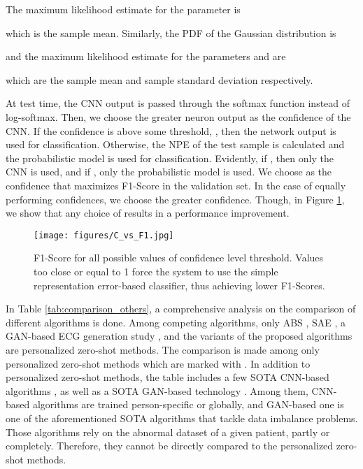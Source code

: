 \documentclass[journal,transmag]{IEEEtran}
\begin{document}
The maximum likelihood estimate for the parameter  is 


which is the sample mean. Similarly, the PDF of the Gaussian distribution is


and the maximum likelihood estimate for the parameters  and  are


which are the sample mean and sample standard deviation respectively.

At test time, the CNN output is passed through the softmax function instead of log-softmax. Then, we choose the greater neuron output as the confidence of the CNN. If the confidence is above some threshold, , then the network output is used for classification. Otherwise, the NPE of the test sample is calculated and the probabilistic model is used for classification. Evidently, if , then only the CNN is used, and if , only the probabilistic model is used. We choose  as the confidence that maximizes F1-Score in the validation set. In the case of equally performing confidences, we choose the greater confidence. Though, in Figure \ref{fig:C_vs_F1}, we show that any choice of  results in a performance improvement. 

\begin{figure}[!htbp]
    \captionsetup{font=footnotesize}
    \centering
    \texttt{[image: figures/C\_vs\_F1.jpg]}
    \caption{F1-Score for all possible values of confidence level threshold. Values too close or equal to 1 force the system to use the simple representation error-based classifier, thus achieving lower F1-Scores.}
    \label{fig:C_vs_F1}
\end{figure}

In Table \ref{tab:comparison_others}, a comprehensive analysis on the comparison of different algorithms is done. Among competing algorithms, only ABS \cite{kiranyaz2017personalized}, SAE \cite{carrera2016ecg}, a GAN-based ECG generation study \cite{zhou2021fully}, and the variants of the proposed algorithms are personalized zero-shot methods. The comparison is made among only personalized zero-shot methods which are marked with . In addition to personalized zero-shot methods, the table includes a few SOTA CNN-based algorithms \cite{kiranyaz2016real, zhai2018automated, li2019automated}, as well as a SOTA GAN-based technology \cite{shaker2020generalization}. Among them, CNN-based algorithms are trained person-specific or globally, and GAN-based one is one of the aforementioned SOTA algorithms that tackle data imbalance problems. Those algorithms rely on the abnormal dataset of a given patient, partly or completely. Therefore, they cannot be directly compared to the personalized zero-shot methods.
\end{document}

